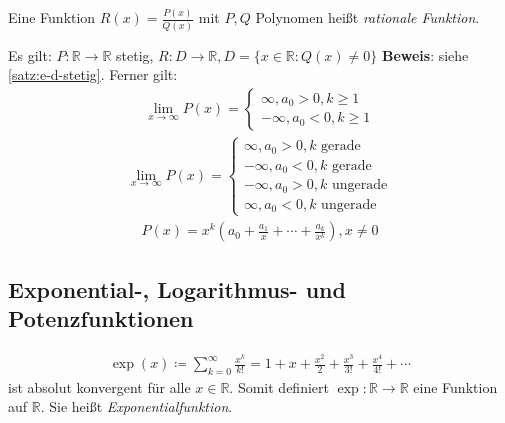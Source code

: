 \documentclass[ngerman,titlepage,twoside, parskip=half*]{scrreprt}
\newcommand*{\R}{\mathbb{R}}
\theoremstyle{break}
\theoremstyle{nonumberbreak}
\begin{document}
Eine Funktion $R(x)=\frac{P(x)}{Q(x)}$ mit $P,Q$ Polynomen heißt \emph{rationale Funktion}.

Es gilt: $P\colon\R\rightarrow\R$ stetig, $R\colon D\rightarrow\R, D=\{x\in \R\colon Q(x)\neq0\}$
\textbf{Beweis}: siehe \autoref{satz:e-d-stetig}. Ferner gilt:
\begin{gather*}\lim_{x\rightarrow\infty}P(x)=\begin{cases}\infty, a_0>0, k\geq 1\\-\infty, a_0<0, k\geq 1\end{cases}\end{gather*}
\begin{gather*}\lim_{x\rightarrow\infty}P(x)=\begin{cases}\infty, a_0>0, k \text{ gerade}\\-\infty, a_0<0, k \text{ gerade}\\-\infty, a_0>0,
k \text{ ungerade}\\\infty, a_0<0, k \text{ ungerade}\end{cases}\end{gather*}
\begin{gather*}P(x)=x^k(a_0+\frac{a_1}{x}+\cdots + \frac{a_k}{x^k}), x \neq 0\end{gather*}

\subsection{Exponential-, Logarithmus- und Potenzfunktionen}

\begin{gather*}\exp(x)\coloneqq\sum_{k=0}^\infty \frac{x^k}{k!}=1+x+\frac{x^2}{2}+\frac{x^3}{3!}+\frac{x^4}{4!}+\cdots\end{gather*}
ist absolut konvergent für alle $x\in \R$. Somit definiert $\exp\colon\R\rightarrow\R$ eine Funktion auf $\R$. Sie heißt
\emph{Exponentialfunktion}.
\end{document}
